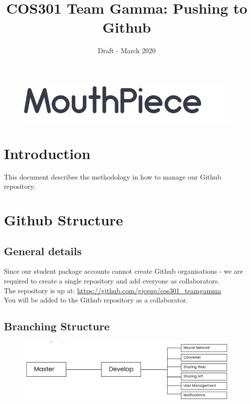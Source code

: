 \documentclass{article}
\begin{document}
\title{COS301 Team Gamma: Pushing to Github}
\begin{figure}
    \centering
    \includegraphics[width=\textwidth]{logo.png}
\end{figure}
\date{Draft - March 2020}

\maketitle

\section{Introduction}
This document describes the methodology in how to manage our Github repository.

\newpage

\section{Github Structure}
\subsection{General details}
Since our student package accounts cannot create Github organisations - we are required to create a single repository and add everyone as collaborators. \\

The repository is up at: \url{https://github.com/gjcsup/cos301_teamgamma} \\

You will be added to the Github repository as a collaborator.

\subsection{Branching Structure}
\begin{figure}[h]
    \centering
    \includegraphics[width=\textwidth]{branches.png}
\end{figure}
\end{document}
